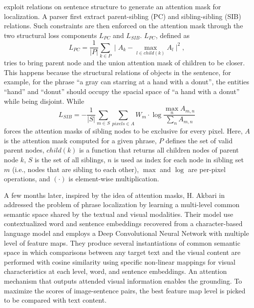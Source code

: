 exploit relations on sentence structure to generate an attention mask
for localization. A parser first extract parent-sibling (PC) and
sibling-sibling (SIB) relations. Such constraints are then enforced on
the attention mask through the two structural loss components $L_{PC}$
and $L_{SIB}$. $L_{PC}$, defined as 
\begin{equation}
  L_{PC} = \frac{1}{|P|} \sum_{k \in P} \mid A_k - \max_{l \in child(k)} A_l \mid ^ 2,
\end{equation}
tries to bring parent node and the union attention mask of children to
be closer. This happens because the structural relations of objects in
the sentence, for example, for the phrase ``a gray can starring at a
hand with a donut'', the entities ``hand'' and ``donut'' should occupy
the spacial space of ``a hand with a donut'' while being disjoint.
While
\begin{equation}
  L_{SIB} = - \frac{1}{|S|} \sum_{m \in S} \sum_{pixels \in A} W_m \cdot \log \frac{\max_n A_{m,n}}{\sum_n A_{m,n}}
\end{equation}
forces the attention masks of sibling nodes to be exclusive for every
pixel. Here, $A$ is the attention mask computed for a given phrase,
$P$ defines the set of valid parent nodes, $child(k)$ is a function
that returns all children nodes of parent node $k$, $S$ is the set of
all siblings, $n$ is used as index for each node in sibling set $m$
(i.e., nodes that are sibling to each other), $\max$ and $\log$ are
per-pixel operations, and $(\cdot)$ is element-wise multiplication.

A few months later, inspired by the idea of attention masks, H. Akbari
\etal{} in \cite{akbari2019multi} addressed the problem of phrase
localization by learning a multi-level common semantic space shared by
the textual and visual modalities. Their model use contextualized word
and sentence embeddings recovered from a character-based language
model and employs a Deep Convolutional Neural Network with multiple
level of feature maps. They produce several instantiations of common
semantic space in which comparisons between any target text and the
visual content are performed with cosine similarity using specific
non-linear mappings for visual characteristics at each level, word,
and sentence embeddings. An attention mechanism that outputs attended
visual information enables the grounding. To maximize the scores of
image-sentence pairs, the best feature map level is picked to be
compared with text content.

